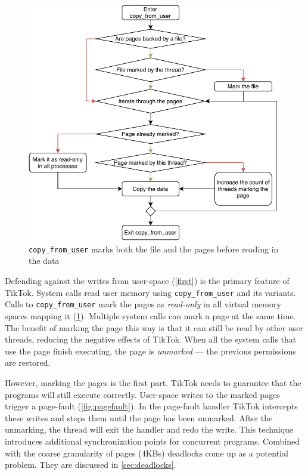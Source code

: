 \label{subsec:memorywrites}
\begin{figure}[]
  \centering
  \includegraphics[width = .45 \textwidth]{img/copy_from_user.pdf}
  \caption{\texttt{copy\_from\_user} marks both the file and the pages before
  reading in the data}
  \label{fig:copyfromuser}
\end{figure}

Defending against the writes from user-space (\cref{first}) is the primary
feature of TikTok. System calls read user memory using \texttt{copy\_from\_user}
and its variants. Calls to \texttt{copy\_from\_user} mark the pages as
\emph{read-only} in all virtual memory spaces mapping it
(\cref{fig:copyfromuser}). Multiple system calls can mark a page at the same
time. The benefit of marking the page this way is that it can still be read by
other user threads, reducing the negative effects of TikTok. When all the system
calls that use the page finish executing, the page is \emph{unmarked} --- the
previous permissions are restored.

However, marking the pages is the first part. TikTok needs to guarantee that the
programs will still execute correctly. User-space writes to the marked pages
trigger a page-fault (\cref{fig:pagefault}). In the page-fault handler TikTok
intercepts these writes and stops them until the page has been unmarked. After
the unmarking, the thread will exit the handler and redo the write. This
technique introduces additional synchronization points for concurrent programs.
Combined with the coarse granularity of pages (4KBs) deadlocks come up as a
potential problem. They are discussed in \cref{sec:deadlocks}.

